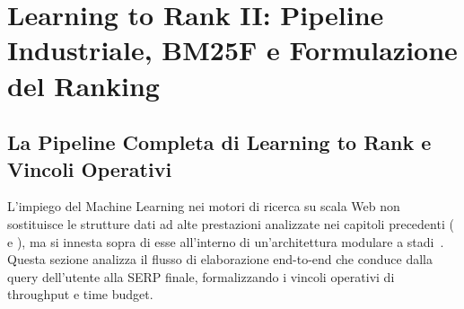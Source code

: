 \chapter{Learning to Rank II: Pipeline Industriale, BM25F e Formulazione del Ranking}
\label{chap:learning-to-rank-avanzato}
\label{chap:learning-to-rank-gbrt}

\FloatBarrier
\section{La Pipeline Completa di Learning to Rank e Vincoli Operativi}
\label{sec:pipeline-ltr-operativa}

L'impiego del Machine Learning nei motori di ricerca su scala Web non sostituisce le strutture dati ad alte prestazioni analizzate nei capitoli precedenti ( e ), ma si innesta sopra di esse all'interno di un'architettura modulare a stadi~\cite{tonellotto2018,bruch2023}. Questa sezione analizza il flusso di elaborazione end-to-end che conduce dalla query dell'utente alla SERP finale, formalizzando i vincoli operativi di throughput e time budget.

\FloatBarrier
